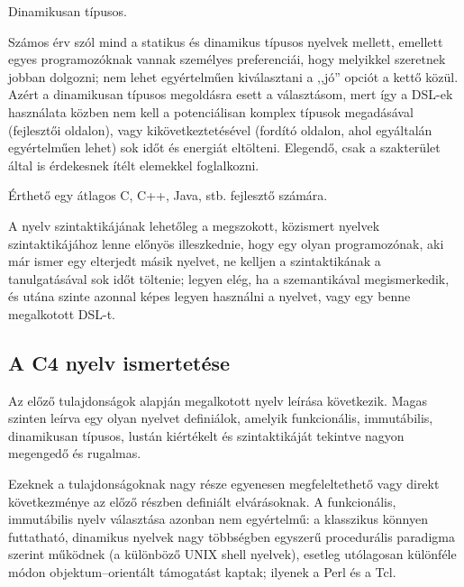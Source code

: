 \begin{property}\label{prop:dynamic}
    Dinamikusan típusos.

    Számos érv szól mind a statikus és dinamikus típusos nyelvek mellett, emellett egyes programozóknak vannak személyes preferenciái, hogy melyikkel szeretnek jobban dolgozni; nem lehet egyértelműen kiválasztani a ,,jó'' opciót a kettő közül.
    Azért a dinamikusan típusos megoldásra esett a választásom, mert így a \gls{DSL}-ek használata közben nem kell a potenciálisan komplex típusok megadásával (fejlesztői oldalon), vagy kikövetkeztetésével (fordító oldalon, ahol egyáltalán egyértelműen lehet) sok időt és energiát eltölteni.
    Elegendő, csak a szakterület által is érdekesnek ítélt elemekkel foglalkozni.
\end{property}

\begin{property}\label{prop:easy}
    Érthető egy átlagos C, C++, Java, stb. fejlesztő számára.

    A nyelv szintaktikájának lehetőleg a megszokott, közismert nyelvek szintaktikájához lenne előnyös illeszkednie, hogy egy olyan programozónak, aki már ismer egy elterjedt másik nyelvet, ne kelljen a szintaktikának a tanulgatásával sok időt töltenie; legyen elég, ha a szemantikával megismerkedik, és utána szinte azonnal képes legyen használni a nyelvet, vagy egy benne megalkotott \gls{DSL}-t.
\end{property}

\subsection{A C4 nyelv ismertetése}\label{subsec:c4:desc:c4}

Az előző tulajdonságok alapján megalkotott nyelv leírása következik.
Magas szinten leírva egy olyan nyelvet definiálok, amelyik funkcionális, immutábilis, dinamikusan típusos, lustán kiértékelt és szintaktikáját tekintve nagyon megengedő és rugalmas.

Ezeknek a tulajdonságoknak nagy része egyenesen megfeleltethető vagy direkt következménye az előző részben definiált elvárásoknak.
A funkcionális, immutábilis nyelv választása azonban nem egyértelmű: a klasszikus könnyen futtatható, dinamikus nyelvek nagy többségben egyszerű procedurális paradigma szerint működnek (\pl a különböző UNIX shell nyelvek), esetleg utólagosan különféle módon objektum--orientált támogatást kaptak; ilyenek \pl a Perl és a Tcl.

